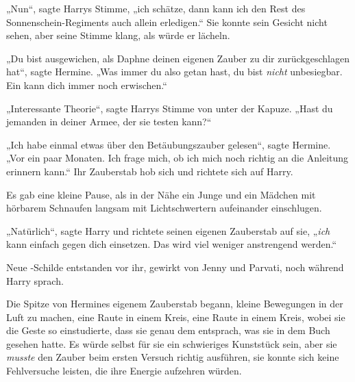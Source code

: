 „Nun“, sagte Harrys Stimme, „ich schätze, dann kann ich den Rest des Sonnenschein-Regiments auch allein erledigen.“ Sie konnte sein Gesicht nicht sehen, aber seine Stimme klang, als würde er lächeln.

„Du bist ausgewichen, als Daphne deinen eigenen Zauber zu dir zurückgeschlagen hat“, sagte Hermine.
„Was immer du also getan hast, du bist \emph{nicht} unbesiegbar. Ein  kann dich immer noch erwischen.“

„Interessante Theorie“, sagte Harrys Stimme von unter der Kapuze.
„Hast du jemanden in deiner Armee, der sie testen kann?“

„Ich habe einmal etwas über den Betäubungszauber gelesen“, sagte Hermine.
„Vor ein paar Monaten. Ich frage mich, ob ich mich noch richtig an die Anleitung erinnern kann.“ Ihr Zauberstab hob sich und richtete sich auf Harry.

Es gab eine kleine Pause, als in der Nähe ein Junge und ein Mädchen mit hörbarem Schnaufen langsam mit Lichtschwertern aufeinander einschlugen.

„Natürlich“, sagte Harry und richtete seinen eigenen Zauberstab auf sie,
„\emph{ich} kann einfach  gegen dich einsetzen. Das wird viel weniger anstrengend werden.“

Neue -Schilde entstanden vor ihr, gewirkt von Jenny und Parvati, noch während Harry sprach.

Die Spitze von Hermines eigenem Zauberstab begann, kleine Bewegungen in der Luft zu machen, eine Raute in einem Kreis, eine Raute in einem Kreis, wobei sie die Geste so einstudierte, dass sie genau dem entsprach, was sie in dem Buch gesehen hatte. Es würde selbst für sie ein schwieriges Kunststück sein, aber sie \emph{musste} den Zauber beim ersten Versuch richtig ausführen, sie konnte sich keine Fehlversuche leisten, die ihre Energie aufzehren würden.

